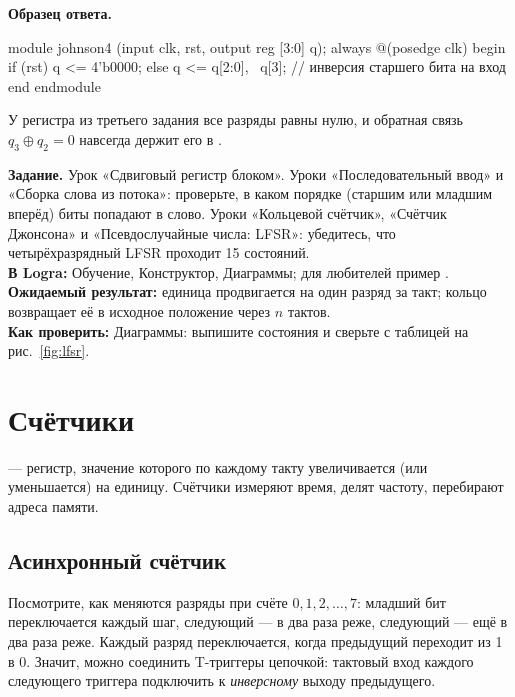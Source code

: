 \textbf{Образец ответа.}
\begin{vcode}
module johnson4 (input clk, rst, output reg [3:0] q);
    always @(posedge clk) begin
        if (rst) q <= 4'b0000;
        else     q <= {q[2:0], ~q[3]};   // инверсия старшего бита на вход
    end
endmodule
\end{vcode}
У регистра из третьего задания все разряды равны нулю, и обратная связь
$q_3\oplus q_2=0$ навсегда держит его в .

\begin{diybox}
\textbf{Задание.}  Урок «Сдвиговый регистр блоком».  Уроки
«Последовательный ввод» и «Сборка слова из потока»: проверьте, в каком порядке
(старшим или младшим вперёд) биты попадают в слово.  Уроки «Кольцевой
счётчик», «Счётчик Джонсона» и «Псевдослучайные числа: LFSR»: убедитесь, что
четырёхразрядный LFSR проходит 15 состояний.\\
\textbf{В Logra:} Обучение, Конструктор, Диаграммы; для любителей
пример .\\
\textbf{Ожидаемый результат:} единица продвигается на один разряд за такт;
кольцо возвращает её в исходное положение через $n$ тактов.\\
\textbf{Как проверить:} Диаграммы: выпишите состояния и сверьте с таблицей
на рис.~\ref{fig:lfsr}.
\end{diybox}

\section{Счётчики}

 --- регистр, значение которого по каждому такту
увеличивается (или уменьшается) на единицу. Счётчики измеряют время, делят
частоту, перебирают адреса памяти.

\subsection{Асинхронный счётчик}

Посмотрите, как меняются разряды при счёте $0, 1, 2, \ldots, 7$: младший бит
переключается каждый шаг, следующий --- в два раза реже, следующий --- ещё в
два раза реже. Каждый разряд переключается, когда предыдущий переходит из 1
в 0. Значит, можно соединить T-триггеры цепочкой: тактовый вход каждого
следующего триггера подключить к \emph{инверсному} выходу предыдущего.

